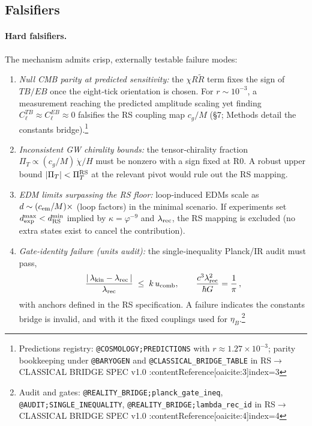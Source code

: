 \documentclass[11pt]{article}
\begin{document}
\subsection{Falsifiers}

\paragraph{Hard falsifiers.}
The mechanism admits crisp, externally testable failure modes:
\begin{enumerate}
  \item \emph{Null CMB parity at predicted sensitivity:} the \(\chi R\tilde R\) term fixes the sign of \(TB/EB\) once the eight‑tick orientation is chosen. For \(r\sim 10^{-3}\), a measurement reaching the predicted amplitude scaling yet finding \(C_\ell^{TB}\approx C_\ell^{EB}\approx 0\) falsifies the RS coupling map \(c_g/M\) (\S7; Methods detail the constants bridge).\footnote{Predictions registry: \texttt{@COSMOLOGY;PREDICTIONS} with \(r\approx 1.27\times 10^{-3}\); parity bookkeeping under \texttt{@BARYOGEN} and \texttt{@CLASSICAL\_BRIDGE\_TABLE} in RS\(\to\)CLASSICAL BRIDGE SPEC v1.0 :contentReference[oaicite:3]{index=3}}
  \item \emph{Inconsistent GW chirality bounds:} the tensor‑chirality fraction \(\Pi_T\propto (c_g/M)\,\dot\chi/H\) must be nonzero with a sign fixed at R0. A robust upper bound \(|\Pi_T|<\Pi_T^{\rm RS}\) at the relevant pivot would rule out the RS mapping.
  \item \emph{EDM limits surpassing the RS floor:} loop‑induced EDMs scale as \(d\sim (c_{\rm em}/M)\times\) (loop factors) in the minimal scenario. If experiments set \(d_{\rm exp}^{\rm max}<d_{\rm RS}^{\rm min}\) implied by \(\kappa=\varphi^{-9}\) and \(\lambda_{\rm rec}\), the RS mapping is excluded (no extra states exist to cancel the contribution).
  \item \emph{Gate‑identity failure (units audit):} the single‑inequality Planck/IR audit must pass,
  \begin{equation}
    \frac{|\,\lambda_{\rm kin}-\lambda_{\rm rec}\,|}{\lambda_{\rm rec}} \;\le\; k\,u_{\rm comb},
    \qquad
    \frac{c^3\lambda_{\rm rec}^2}{\hbar G}=\frac{1}{\pi}\,,
  \end{equation}
  with anchors defined in the RS specification. A failure indicates the constants bridge is invalid, and with it the fixed couplings used for \(\eta_B\).\footnote{Audit and gates: \texttt{@REALITY\_BRIDGE;planck\_gate\_ineq}, \texttt{@AUDIT;SINGLE\_INEQUALITY}, \texttt{@REALITY\_BRIDGE;lambda\_rec\_id} in RS\(\to\)CLASSICAL BRIDGE SPEC v1.0 :contentReference[oaicite:4]{index=4}}
\end{enumerate}
\end{document}
